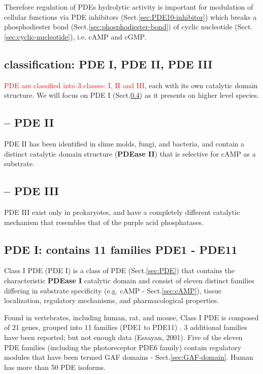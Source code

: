 Therefore regulation of PDEs hydrolytic activity is important for modulation of
cellular functions via PDE inhibitors (Sect.\ref{sec:PDE10-inhibitor}) which
breaks a phosphodiester bond (Sect.\ref{sec:phosphodiester-bond}) of cyclic
nucleotide (Sect.\ref{sec:cyclic-nucleotide}), i.e. cAMP and cGMP.


\subsection{classification: PDE I, PDE II, PDE III}
\label{sec:PDE-classification}

\textcolor{red}{PDE are classified into 3 classes: I, II and III}, each with
its own catalytic domain structure. We will focus on PDE I
(Sect.\ref{sec:PDE-I}) as it presents on higher level species.

\subsection{-- PDE II}
\label{sec:PDE-II}

PDE II has been  identified in slime molds, fungi, and bacteria, and contain a
distinct catalytic domain structure ({\bf PDEase II}) that is selective for cAMP
as a substrate. 

\subsection{-- PDE III}
\label{sec:PDE-III}

PDE III exist only in prokaryotes, and have a completely different catalytic
mechanism that resembles that of the purple acid phosphatases.

\subsection{PDE I: contains 11 families PDE1 - PDE11}
\label{sec:PDE-I}


Class I PDE (PDE I) is a class of PDE (Sect.\ref{sec:PDE}) that contains the
characteristic {\bf PDEase I} catalytic domain and consist of eleven distinct
families differing in substrate specificity (e.g. cAMP - Sect.\ref{sec:cAMP}),
tissue localization, regulatory mechanisms, and pharmacological properties.

Found in vertebrates, including human, rat, and mouse, Class I PDE is composed
of 21 genes, grouped into 11 families (PDE1 to PDE11) \citep{Omori2007} .
3 additional families have been reported; but not enough data (Essayan, 2001).
Five of the eleven PDE families (including the photoreceptor PDE6 family)
contain regulatory modules that have been termed GAF domains -
Sect.\ref{sec:GAF-domain}. Human has more than 50 PDE isoforms.

